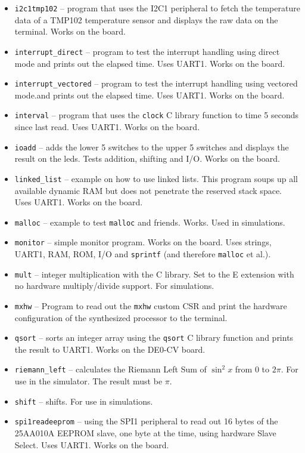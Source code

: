\documentclass[12pt]{article}
\begin{document}
\begin{itemize}
\item \lstinline|i2c1tmp102| -- program that uses the I2C1 peripheral to fetch the temperature data of a TMP102 temperature sensor and displays the raw data on the terminal. Works on the board.
\item \lstinline|interrupt_direct| -- program to test the interrupt handling using direct mode and prints out the elapsed time. Uses UART1. Works on the board.
\item \lstinline|interrupt_vectored| -- program to test the interrupt handling using vectored mode.and prints out the elapsed time. Uses UART1. Works on the board.
\item \lstinline|interval| -- program that uses the \lstinline|clock| C library function to time 5 seconds since last read. Uses UART1. Works on the board.
\item \lstinline|ioadd| -- adds the lower 5 switches to the upper 5 switches and displays the result on the leds. Tests addition, shifting and I/O. Works on the board.
\item \lstinline|linked_list| -- example on how to use linked lists. This program soups up all available dynamic RAM but does not penetrate the reserved stack space. Uses UART1. Works on the board.
\item \lstinline|malloc| -- example to test \lstinline|malloc| and friends. Works. Used in simulations.
\item \lstinline|monitor| -- simple monitor program. Works on the board. Uses strings, UART1, RAM, ROM, I/O and \lstinline|sprintf| (and therefore \lstinline|malloc| et al.).
\item \lstinline|mult| -- integer multiplication with the C library. Set to the E extension with no hardware multiply/divide support. For simulations.
\item \lstinline|mxhw| -- Program to read out the \lstinline|mxhw| custom CSR and print the hardware configuration of the synthesized processor to the terminal.
\item \lstinline|qsort| -- sorts an integer array using the \lstinline|qsort| C library function and prints the result to UART1. Works on the DE0-CV board.
\item \lstinline|riemann_left| -- calculates the Riemann Left Sum of $\sin^2 x$ from $0$ to $2\pi$. For use in the simulator. The  result must be $\pi$.
\item \lstinline|shift| -- shifts. For use in simulations.
\item \lstinline|spi1readeeprom| -- using the SPI1 peripheral to read out 16 bytes of the 25AA010A EEPROM slave, one byte at the time, using hardware Slave Select. Uses UART1. Works on the board.

\end{itemize}
\end{document}
